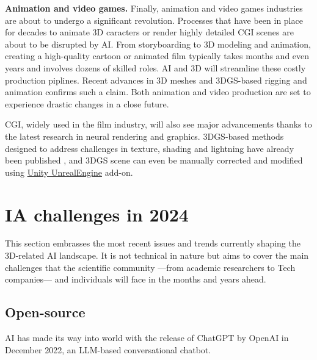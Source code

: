 \noindent \textbf{Animation and video games.} Finally, animation and video games industries are about to undergo a significant revolution. Processes that have been in place for decades to animate 3D caracters or render highly detailed \ac{CGI} scenes are about to be disrupted by \ac{AI}. From storyboarding to 3D modeling and animation, creating a high-quality cartoon or animated film typically takes months and even years and involves dozens of skilled roles. \ac{AI} and 3D will streamline these costly production piplines. Recent advances in 3D meshes and 3D\ac{GS}-based rigging and animation \citep{qian2023gaussianavatars,li2024animatablegaussians} confirms such a claim. Both animation and video production are set to experience drastic changes in a close future. 

\ac{CGI}, widely used in the film industry, will also see major advancements thanks to the latest research in neural rendering and graphics. 3D\ac{GS}-based methods designed to address challenges in texture, shading and lightning have already been published \citep{jiang2023gaussianshader,wu2024deferredgs}, and 3D\ac{GS} scene can even be manually corrected and modified using \href{https://github.com/aras-p/UnityGaussianSplatting/}{Unity UnrealEngine} add-on. 


\section{IA challenges in 2024}

This section embrasses the most recent issues and trends currently shaping the 3D-related \ac{AI} landscape. It is not technical in nature but aims to cover the main challenges that the scientific community —from academic researchers to Tech companies— and individuals will face in the months and years ahead.

\subsection{Open-source}
\label{sec:conclusion-open}
\ac{AI} has made its way into world with the release of ChatGPT by OpenAI in December 2022, an \ac{LLM}-based conversational chatbot. 

